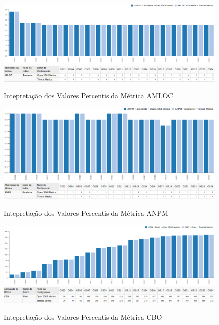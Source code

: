 \begin{apendicesenv}
\begin{figure}
\centering
\includegraphics[scale=0.70]{figuras/amloc-grafico.eps}
\includegraphics[scale=0.70]{figuras/amloc-tabela.eps}
\caption{Intepretação dos Valores Percentis da Métrica AMLOC}
\label{fig:metric-amloc}
\FloatBarrier
\end{figure}

\begin{figure}
\centering
\includegraphics[scale=0.75]{figuras/anpm-completo.eps}
\includegraphics[scale=0.70]{figuras/anpm-projeto.eps}
\caption{Intepretação dos Valores Percentis da Métrica ANPM}
\label{fig:metric-anpm}
\FloatBarrier
\end{figure}

\begin{figure}
\centering
\includegraphics[scale=0.70]{figuras/cbo-grafico.eps}
\includegraphics[scale=0.70]{figuras/cbo-tabela.eps}
\caption{Intepretação dos Valores Percentis da Métrica CBO}
\label{fig:metric-cbo}
\FloatBarrier
\end{figure}


\end{apendicesenv}

